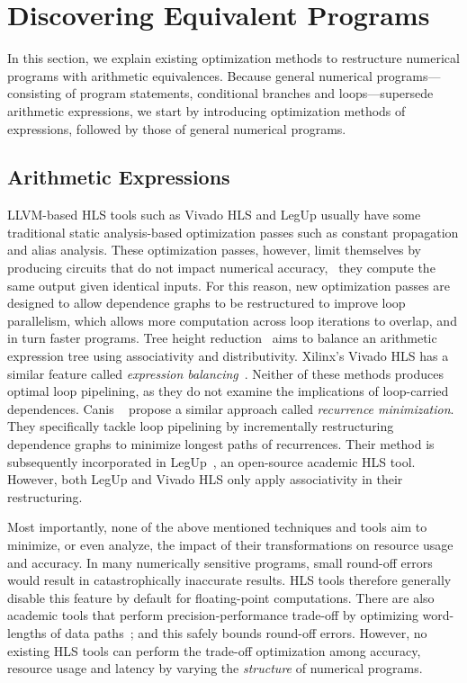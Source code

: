 \section{Discovering Equivalent Programs}
\label{bg:sec:discovering_equivalent_programs}

In this section, we explain existing optimization methods to restructure
numerical programs with arithmetic equivalences.  Because general numerical
programs---consisting of program statements, conditional branches and
loops---supersede arithmetic expressions, we start by introducing optimization
methods of expressions, followed by those of general numerical programs.


\subsection{Arithmetic Expressions}
\label{bg:sub:arithmetic_expressions}

LLVM-based HLS tools such as Vivado HLS and LegUp usually have some
traditional static analysis-based optimization passes such as constant
propagation and alias analysis.  These optimization passes, however, limit
themselves by producing circuits that do not impact numerical accuracy,
\ie~they compute the same output given identical inputs.  For this reason,
new optimization passes are designed to allow dependence graphs to be
restructured to improve loop parallelism, which allows more computation
across loop iterations to overlap, and in turn faster programs.  Tree height
reduction~\cite{nicolau91} aims to balance an arithmetic expression tree using
associativity and distributivity.  Xilinx's Vivado HLS has a similar feature
called \emph{expression balancing}~\cite{vivado_hls}.  Neither of these methods
produces optimal loop pipelining, as they do not examine the implications
of loop-carried dependences.  Canis \etal~\cite{canis14} propose a similar
approach called \emph{recurrence minimization}. They specifically tackle
loop pipelining by incrementally restructuring dependence graphs to minimize
longest paths of recurrences.  Their method is subsequently incorporated in
LegUp~\cite{legup}, an open-source academic HLS tool.  However, both LegUp and
Vivado HLS only apply associativity in their restructuring.

Most importantly, none of the above mentioned techniques and tools aim to
minimize, or even analyze, the impact of their transformations on resource
usage and accuracy. In many numerically sensitive programs, small round-off
errors would result in catastrophically inaccurate results.  HLS tools
therefore generally disable this feature by default for floating-point
computations.  There are also academic tools that perform precision-performance
trade-off by optimizing word-lengths of data paths~\cite{constantinides};
and this safely bounds round-off errors.  However, no existing HLS tools can
perform the trade-off optimization among accuracy, resource usage and latency
by varying the \emph{structure} of numerical programs.

